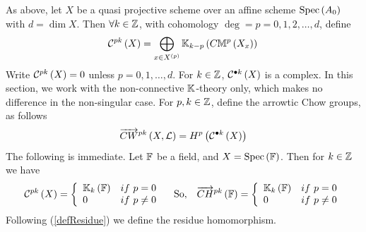 \documentclass[12pt]{article}
\begin{document}
\bD\label{eaKnotaSptrCx}{\rm 
As above, let  $X$ be a quasi projective scheme over an affine scheme $\spec{A_0}$ with $d=\dim X$. 
Then $\forall k \in {\BZ}$, with cohomology $\deg=p=0, 1, 2, \ldots, d$, %
define
%
\begin{equation}\label{eaKlabelNOta}
{\CC}^{pk}\LRf{X}= \bigoplus_{x\in X^{\LRf{p}}}{\BK}_{k-p}\LRf{C{\BM}^{p}\LRf{X_x}} \\
\end{equation}
Write ${\CC}^{pk}\LRf{X}=0$ unless $p=0, 1, \ldots, d$. 
%
For $k\in {\BZ}$,   ${\CC}^{{\bul}k}\LRf{X}$ is a complex. In this section, we work with the non-connective ${\BK}$-theory only, which makes no difference in the non-singular case. For $p, k\in {\BZ}$, define the arrowtic Chow groups, as
follows
$$
\ora{CW}^{pk}\LRf{X, {\CL}}= H^p\LRf{{\CC}^{{\bul}k}\LRf{X}} 
$$
}
\eD
The following is immediate.
\bExr\label{eaKmilJinh}{\rm 
Let ${\BF}$ be a field, and $X=\spec{{\BF}}$. Then for 
$k\in {\BZ}$ we have 
$$
{\CC}^{pk}\LRf{X}= \LBrace{{ll}
{\BK}_k\LRf{{\BF}} & if~p=0\\
0 & if ~p\neq 0\\
}
\quad {\rm So, }\quad
\ora{CH}^{pk}\LRf{{\BF}}= \LBrace{{ll}
{\BK}_k\LRf{{\BF}} & if~p=0\\
0 & if ~p\neq 0\\
}
$$
}
\eExr
Following (\ref{defResidue}) we define the residue homomorphism. 
\end{document}
